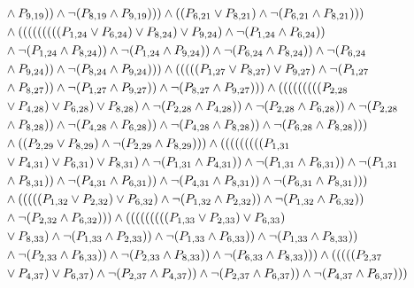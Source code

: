 \documentclass[10pt]{article}
\begin{document}
\begin{align*}
& \land \PV{9,19})) \land \lnot(\PV{8,19} \land \PV{9,19}))) \land ((\PV{6,21} \lor \PV{8,21}) \land \lnot(\PV{6,21} \land \PV{8,21}))) \\
& \land (((((((((\PV{1,24} \lor \PV{6,24}) \lor \PV{8,24}) \lor \PV{9,24}) \land \lnot(\PV{1,24} \land \PV{6,24})) \\
& \land \lnot(\PV{1,24} \land \PV{8,24})) \land \lnot(\PV{1,24} \land \PV{9,24})) \land \lnot(\PV{6,24} \land \PV{8,24})) \land \lnot(\PV{6,24} \\
& \land \PV{9,24})) \land \lnot(\PV{8,24} \land \PV{9,24}))) \land (((((\PV{1,27} \lor \PV{8,27}) \lor \PV{9,27}) \land \lnot(\PV{1,27} \\
& \land \PV{8,27})) \land \lnot(\PV{1,27} \land \PV{9,27})) \land \lnot(\PV{8,27} \land \PV{9,27}))) \land (((((((((\PV{2,28} \\
& \lor \PV{4,28}) \lor \PV{6,28}) \lor \PV{8,28}) \land \lnot(\PV{2,28} \land \PV{4,28})) \land \lnot(\PV{2,28} \land \PV{6,28})) \land \lnot(\PV{2,28} \\
& \land \PV{8,28})) \land \lnot(\PV{4,28} \land \PV{6,28})) \land \lnot(\PV{4,28} \land \PV{8,28})) \land \lnot(\PV{6,28} \land \PV{8,28}))) \\
& \land ((\PV{2,29} \lor \PV{8,29}) \land \lnot(\PV{2,29} \land \PV{8,29}))) \land (((((((((\PV{1,31} \\
& \lor \PV{4,31}) \lor \PV{6,31}) \lor \PV{8,31}) \land \lnot(\PV{1,31} \land \PV{4,31})) \land \lnot(\PV{1,31} \land \PV{6,31})) \land \lnot(\PV{1,31} \\
& \land \PV{8,31})) \land \lnot(\PV{4,31} \land \PV{6,31})) \land \lnot(\PV{4,31} \land \PV{8,31})) \land \lnot(\PV{6,31} \land \PV{8,31}))) \\
& \land (((((\PV{1,32} \lor \PV{2,32}) \lor \PV{6,32}) \land \lnot(\PV{1,32} \land \PV{2,32})) \land \lnot(\PV{1,32} \land \PV{6,32})) \\
& \land \lnot(\PV{2,32} \land \PV{6,32}))) \land (((((((((\PV{1,33} \lor \PV{2,33}) \lor \PV{6,33}) \\
& \lor \PV{8,33}) \land \lnot(\PV{1,33} \land \PV{2,33})) \land \lnot(\PV{1,33} \land \PV{6,33})) \land \lnot(\PV{1,33} \land \PV{8,33})) \\
& \land \lnot(\PV{2,33} \land \PV{6,33})) \land \lnot(\PV{2,33} \land \PV{8,33})) \land \lnot(\PV{6,33} \land \PV{8,33}))) \land (((((\PV{2,37} \\
& \lor \PV{4,37}) \lor \PV{6,37}) \land \lnot(\PV{2,37} \land \PV{4,37})) \land \lnot(\PV{2,37} \land \PV{6,37})) \land \lnot(\PV{4,37} \land \PV{6,37}))) \\

\end{align*}
\end{document}
